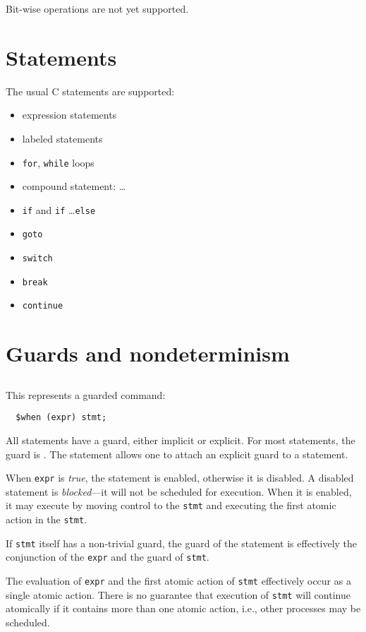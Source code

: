 Bit-wise operations are not yet supported.

\section{Statements}

The usual C statements are supported:
\begin{itemize}
\item expression statements
\item labeled statements
\item \texttt{for}, \texttt{while} loops
\item compound statement: \lb \ldots \rb
\item \texttt{if} and \verb!if! \ldots \verb!else!
\item \verb!goto!
\item \verb!switch!
\item \verb!break!
\item \verb!continue!
\end{itemize}

\section{Guards and nondeterminism}

\subsection{\cwhen} This represents a guarded command:
\begin{verbatim}
  $when (expr) stmt;
\end{verbatim}
All statements have a guard, either implicit or explicit.  For most
statements, the guard is \ctrue.  The \cwhen{} statement allows one to
attach an explicit guard to a statement.

When \texttt{expr} is \emph{true}, the statement is enabled, otherwise
it is disabled.  A disabled statement is \emph{blocked}---it will not
be scheduled for execution.  When it is enabled, it may execute by
moving control to the \texttt{stmt} and executing the first atomic
action in the \texttt{stmt}.

If \texttt{stmt} itself has a non-trivial guard, the guard of the
\cwhen{} statement is effectively the conjunction of the \texttt{expr}
and the guard of \texttt{stmt}.

The evaluation of \texttt{expr} and the first atomic action of
\texttt{stmt} effectively occur as a single atomic action.  There is
no guarantee that execution of \texttt{stmt} will continue atomically
if it contains more than one atomic action, i.e., other processes may
be scheduled.

